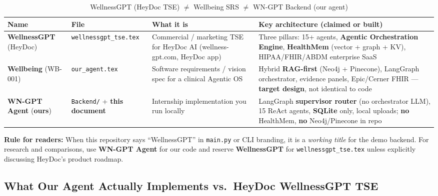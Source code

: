 \documentclass[12pt,a4paper]{article}
\begin{document}
\begin{table}[H]
\centering
\renewcommand{\arraystretch}{1.4}
\small
\begin{tabularx}{\textwidth}{@{}p{2.6cm}p{3.2cm}p{4.2cm}p{4.5cm}@{}}
\toprule
\textbf{Name} & \textbf{File} & \textbf{What it is} & \textbf{Key architecture (claimed or built)} \\
\midrule
\textbf{WellnessGPT} (HeyDoc) &
\texttt{wellnessgpt\_tse.tex} &
Commercial / marketing TSE for HeyDoc AI (wellness-gpt.com, HeyDoc app) &
Three pillars: 15+ agents, \textbf{Agentic Orchestration Engine}, \textbf{HealthMem} (vector + graph + KV), HIPAA/FHIR/ABDM enterprise SaaS \\

\textbf{Wellbeing} (WB-001) &
\texttt{our\_agent.tex} &
Software requirements / vision spec for a clinical Agentic OS &
Hybrid \textbf{RAG-first} (Neo4j + Pinecone), LangGraph orchestrator, evidence panels, Epic/Cerner FHIR --- \textbf{target design}, not identical to code \\

\textbf{WN-GPT Agent} (\textbf{ours}) &
\texttt{Backend/} + \textbf{this document} &
Internship implementation you run locally &
LangGraph \textbf{supervisor router} (no orchestrator LLM), 15 ReAct agents, \textbf{SQLite} only, local uploads; \textbf{no} HealthMem, \textbf{no} Neo4j/Pinecone in repo \\
\bottomrule
\end{tabularx}
\caption{WellnessGPT (HeyDoc TSE) $\neq$ Wellbeing SRS $\neq$ WN-GPT Backend (our agent)}
\end{table}

\begin{mdframed}[backgroundcolor=lightgray, linecolor=warningred, linewidth=1pt]
\textbf{Rule for readers:} When this repository says ``WellnessGPT'' in \texttt{main.py} or CLI branding, it is a \emph{working title} for the demo backend. For research and comparisons, use \textbf{WN-GPT Agent} for our code and reserve \textbf{WellnessGPT} for \texttt{wellnessgpt\_tse.tex} unless explicitly discussing HeyDoc's product roadmap.
\end{mdframed}

\subsection{What Our Agent Actually Implements vs.\ HeyDoc WellnessGPT TSE}
\end{document}
